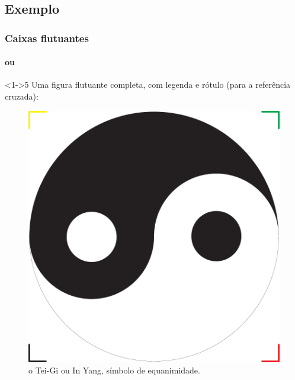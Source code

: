 \documentclass[handout,10pt]{beamer}
\begin{document}
\subsection{Exemplo}
\begin{frame}[fragile]
	\frametitle{Caixas flutuantes}
	\framesubtitle{ou }

	\begin{atividade}<1->{5}
		Uma figura flutuante completa, com legenda e rótulo (para a referência 	
		cruzada):
	
		\begin{LaTeXcode}
			\begin{figure}[htb]
			  \centering
			  \includegraphics[height=0.2\textheight]{Tei-Gi}
			  \caption{o Tei-Gi ou In Yang, símbolo
			    de equanimidade.}
			  \label{fig:tei-gi}
			\end{figure}
		\end{LaTeXcode}
	\end{atividade}
	
\end{frame}
\end{document}
